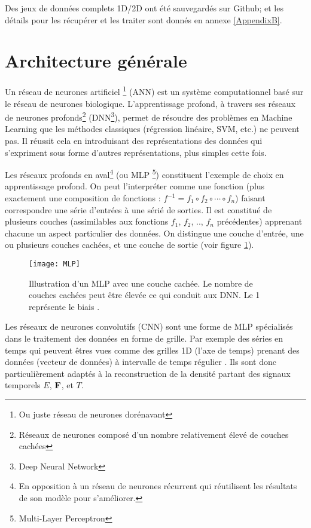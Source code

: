 Des jeux de données complets 1D/2D ont été sauvegardés sur Github; et les détails pour les récupérer et les traiter sont donnés en annexe \ref{AppendixB}.


\section{Architecture générale}

Un réseau de neurones artificiel \footnote{Ou juste réseau de neurones dorénavant} (ANN) est un système computationnel basé sur le réseau de neurones biologique. L'apprentissage profond, à travers ses réseaux de neurones profonds\footnote{Réseaux de neurones composé d'un nombre relativement élevé de couches cachées} (DNN\footnote{Deep Neural Network}), permet de résoudre des problèmes en Machine Learning que les méthodes classiques (régression linéaire, SVM, etc.) ne peuvent pas. Il réussit cela en introduisant des représentations des données qui s'expriment sous forme d'autres représentations, plus simples cette fois. 

Les réseaux profonds en aval\footnote{En opposition à un réseau de neurones récurrent qui réutilisent les résultats de son modèle pour s'améliorer.} (ou MLP \footnote{Multi-Layer Perceptron}) constituent l'exemple de choix en apprentissage profond. On peut l'interpréter comme une fonction (plus exactement une composition de fonctions : $f^{-1} = f_1 \circ f_2 \circ \cdots \circ f_n$) faisant correspondre une série d'entrées à une sérié de sorties. Il est constitué de plusieurs couches (assimilables aux fonctions $f_1$, $f_2$, .., $f_n$ précédentes) apprenant chacune un aspect particulier des données. On distingue une couche d'entrée, une ou plusieurs couches cachées, et une couche de sortie (voir figure \ref{fig:MLP}).


\begin{figure}[!h]
\centering
\texttt{[image: MLP]} 
\decoRule
\caption[MLP]{Illustration d'un MLP avec une couche cachée. Le nombre de couches cachées peut être élevée ce qui conduit aux DNN. Le 1 représente le biais \parencite[286]{Reference8}.}
\label{fig:MLP}
\end{figure}

Les réseaux de neurones convolutifs (CNN) sont une forme de MLP spécialisés dans le traitement des données en forme de grille. Par exemple des séries en temps qui peuvent êtres vues comme des grilles 1D (l'axe de temps) prenant des données (vecteur de données) à intervalle de temps régulier \parencite{Reference5}. Ils sont donc particulièrement adaptés à la reconstruction de la densité partant des signaux temporels $E$, $\mathbf{F}$, et $T$. 

